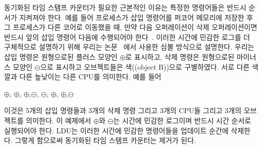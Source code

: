 동기화된 타임 스탬프 카운터가 필요한 근본적인 이유는 특정한 명령어들은 반드시 순서가 
지켜져야 한다.
예를 들어 프로세스가 삽입 명령어를 퍼코어 메모리에 저장한 후 그 프로세스가 다른 코어로 
이동했을 때, 만약 다음 오퍼레이션이 삭제 오퍼레이션이면 반드시 앞의 삽입 명령어 
다음에 수행되어야 한다~\cite{SilasBoydWickizerPth}. 
이러한 시간에 민감한 로그를 더 구체적으로 설명하기 위해 우리는 논문 ~\cite{Clements15SCR}에서 
사용한 심볼 방식으로 설명한다.   
우리는 삽입 명령은 원형으로된 플러스 모양인 $\oplus$로 표시하고, 삭제 명령은 원형으로된 
마이너스 모양인 $\ominus$으로 표시하고 오브젝트들은 색((object B))으로 구별하였다.
서로 다른 색깔과 다른 높낮이는 다른 CPU를 의미한다. 
예를 들어
\begin{center}
$\oplus$, $\oplus$, $\oplus$,$\ominus$,
$\ominus$, $\oplus$, $\oplus$,$\ominus$
\end{center}
이것은 5개의 삽입 명령들과 3개의 삭제 명령 그리고 3개의 CPU들 그리고 3개의 오브젝트를 의미한다.
이 예제에서 $\oplus$와 $\ominus$는 시간에 민감한 로그이며 반드시 시간 순서로
실행되어야 한다.  
LDU는 이러한 시간에 민감한 명령어들을 업데이트 순간에 삭제한다. 그렇게 함으로써 
동기화된 타임 스탬프 카운터는 제거가 된다.
